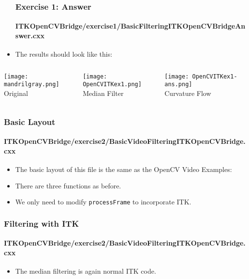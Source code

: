 \begin{frame}
\begin{itemize}
\frametitle{Exercise 1: Answer}
\framesubtitle{ITKOpenCVBridge/exercise1/BasicFilteringITKOpenCVBridgeAnswer.cxx}
\item The results should look like this:
\end{itemize}
\begin{columns}[c]
\begin{center}
\texttt{[image: mandrilgray.png]} \\
Original
\end{center}
\begin{center}
\texttt{[image: OpenCVITKex1.png]} \\
Median Filter
\end{center}
\begin{center}
\texttt{[image: OpenCVITKex1-ans.png]} \\
Curvature Flow
\end{center}
\end{columns}
\end{frame}


\begin{frame}
\frametitle{Basic Layout}
\framesubtitle{ITKOpenCVBridge/exercise2/BasicVideoFilteringITKOpenCVBridge.cxx}
\begin{itemize}
\item The basic layout of this file is the same as the OpenCV Video
  Examples:
\item There are three functions as before.
\pause
\item We only need to modify {\tt processFrame} to incorporate ITK.
\end{itemize}
\end{frame}

\begin{frame}
\frametitle{Filtering with ITK}
\framesubtitle{ITKOpenCVBridge/exercise2/BasicVideoFilteringITKOpenCVBridge.cxx}
\begin{itemize}
\item The median filtering is again normal ITK code.
\end{itemize}
\end{frame}

